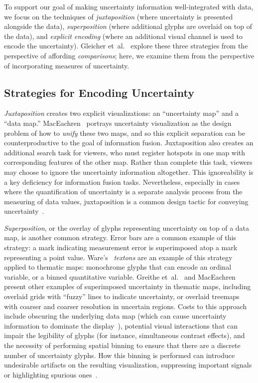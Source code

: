 \documentclass{vgtc}                          %
\newcommand{\ea}{{et~al.}\xspace}
\begin{document}
To support our goal of making uncertainty information well-integrated with data, we focus on the techniques of \emph{juxtaposition} (where uncertainty is presented alongside the data), \emph{superposition} (where additional glyphs are overlaid on top of the data), and \emph{explicit encoding} (where an additional visual channel is used to encode the uncertainty). Gleicher \ea~\cite{gleicher2011visual} explore these three strategies from the perspective of affording \emph{comparisons}; here, we examine them from the perspective of incorporating measures of uncertainty.

\subsection{Strategies for Encoding Uncertainty}

\emph{Juxtaposition} creates two explicit visualizations: an ``uncertainty map'' and a ``data map.'' MacEachren~\cite{maceachren1992visualizing} portrays uncertainty visualization as the design problem of how to \emph{unify} these two maps, and so this explicit separation can be counterproductive to the goal of information fusion. Juxtaposition also creates an additional search task for viewers, who must register hotspots in one map with corresponding features of the other map. Rather than complete this task, viewers may choose to ignore the uncertainty information altogether. This ignoreability is a key deficiency for information fusion tasks. Nevertheless, especially in cases where the quantification of uncertainty is a separate analysis process from the measuring of data values, juxtaposition is a common design tactic for conveying uncertainty~\cite{moritz2017trust}.

\emph{Superposition}, or the overlay of glyphs representing uncertainty on top of a data map, is another common strategy. Error bars are a common example of this strategy: a mark indicating measurement error is superimposed atop a mark representing a point value. Ware's~\cite{ware2009quantitative} \emph{textons} are an example of this strategy applied to thematic maps: monochrome glyphs that can encode an ordinal variable, or a binned quantitative variable. Greithe \ea~\cite{griethe2006visualization} and MacEachren~\cite{maceachren1992visualizing,maceachren1998visualizing} present other examples of superimposed uncertainty in thematic maps, including overlaid grids with ``fuzzy'' lines to indicate uncertainty, or overlaid treemaps with coarser and coarser resolution in uncertain regions. Costs to this approach include obscuring the underlying data map (which can cause uncertainty information to dominate the display~\cite{brodlie2012review}), potential visual interactions that can impair the legibility of glyphs (for instance, simultaneous contrast effects), and the necessity of performing spatial binning to ensure that there are a discrete number of uncertainty glyphs. How this binning is performed can introduce undesirable artifacts on the resulting visualization, suppressing important signals or highlighting spurious ones~\cite{battersby2016shapes}.
\end{document}
